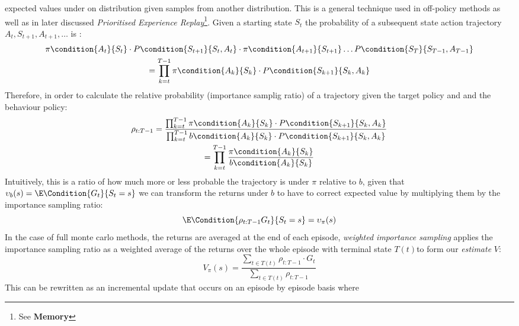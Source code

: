 expected values under on distribution given samples from another distribution. This is 
a general technique used in off-policy methods \cite{sutton2018reinforcement} as well as in later discussed \emph{Prioritised
Experience Replay}\footnote{See \textbf{Memory}}. Given a starting
state $S_t$ the probability of a subsequent state action trajectory $A_t, S_{t+1}, A_{t+1}, \hdots $ is :
\begin{equation}
    \begin{gathered}
        \pi \condition{A_t}{S_t} \cdot P\condition{S_{t+1}}{S_t, A_t} \cdot \pi \condition{A_{t+1}}{S_{t+1}} \hdots P\condition{S_T}{S_{T-1}, A_{T-1}} \\
        = \prod_{k=t}^{T-1}\pi\condition{A_k}{S_k} \cdot P\condition{S_{k+1}}{S_k,A_k}
    \end{gathered}
\end{equation}
Therefore, in order to calculate the relative probability (importance samplig ratio) of a trajectory given the
target policy and and the behaviour policy:
\begin{equation}
    \begin{gathered}
        \rho_{t:T-1} = \frac{\prod_{k=t}^{T-1}\pi\condition{A_k}{S_k} \cdot P\condition{S_{k+1}}{S_k,A_k}}{\prod_{k=t}^{T-1}b\condition{A_k}{S_k} \cdot P\condition{S_{k+1}}{S_k,A_k}} \\
        = \prod_{k=t}^{T-1}\frac{\pi\condition{A_k}{S_k}}{b\condition{A_k}{S_k}}
    \end{gathered}
\end{equation}
Intuitively, this is a ratio of how much more or less probable the trajectory is under $\pi$ relative to $b$,
given that $\upsilon_b(s) = \E\Condition{G_t}{S_t = s}$ we can transform
the returns under $b$ to have to correct expected value by multiplying them
by the importance sampling ratio:
\begin{equation}
    \E\Condition{\rho_{t:T-1}G_t}{S_t = s} = \upsilon_\pi(s)
\end{equation}
In the case of full monte carlo methods, the returns are averaged at the end of each episode,
\emph{weighted importance sampling} applies the importance sampling ratio as a weighted
average of the returns over the whole episode with terminal state $T(t)$to form our \emph{estimate} $V$:
\begin{equation}
    V_\pi(s) = \frac{\sum_{t \in T(t)} \rho_{t:T-1} \cdot G_t}{\sum_{t \in T(t)} \rho_{t:T-1}}
\end{equation}
This can be rewritten as an incremental update that occurs on an episode by episode basis where
